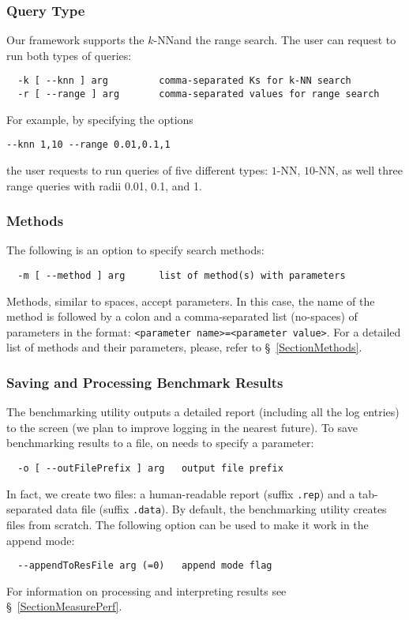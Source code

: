 \documentclass[runningheads,a4paper]{llncs}
\newcommand{\ttt}[1]{\texttt{#1}}
\newcommand{\knn}{$k$-NN}
\begin{document}
\subsubsection{Query Type} 
Our framework supports the \knn and the range search.
The user can request to run both types of queries:
\begin{verbatim}
  -k [ --knn ] arg         comma-separated Ks for k-NN search
  -r [ --range ] arg       comma-separated values for range search
\end{verbatim}
For example, by specifying the options 
\begin{verbatim}
--knn 1,10 --range 0.01,0.1,1
\end{verbatim}
the user requests to run queries of five different types: $1$-NN, $10$-NN,
as well three range queries with radii 0.01, 0.1, and 1.

\subsubsection{Methods}
The following is an option to specify search methods:
\begin{verbatim}
  -m [ --method ] arg      list of method(s) with parameters
\end{verbatim}
Methods, similar to spaces, accept parameters. 
In this case,
the name of the method is followed by a colon and a comma-separated list (no-spaces)
of parameters in the format:
\ttt{<parameter name>=<parameter value>}.
For a detailed list of methods and their parameters, please, refer to \S~\ref{SectionMethods}.

\subsubsection{Saving and Processing Benchmark Results}
The benchmarking utility outputs a detailed report (including all the log entries) to the screen
(we plan to improve logging in the nearest future).
To save benchmarking results to a file, on needs to specify a parameter:
\begin{verbatim}
  -o [ --outFilePrefix ] arg   output file prefix
\end{verbatim}
In fact, we create two files: a human-readable report (suffix \ttt{.rep}) and 
a tab-separated data file (suffix \ttt{.data}).
By default, the benchmarking utility creates files from scratch. The
following option can be used to make it work in the append mode:
\begin{verbatim}
  --appendToResFile arg (=0)   append mode flag
\end{verbatim}
For information on processing and interpreting results see \S~\ref{SectionMeasurePerf}.
\end{document}

